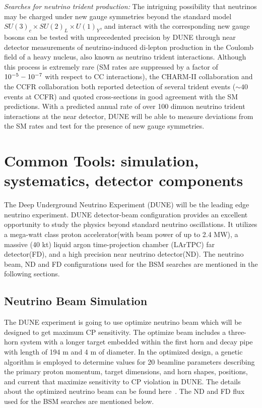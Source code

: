 {\it Searches for neutrino trident production:} The intriguing possibility that neutrinos may be charged under new gauge symmetries beyond the standard model $SU(3)_{c} \times SU(2)_{L} \times U(1)_{Y}$, and interact with the corresponding new gauge bosons can be tested with unprecedented precision by DUNE through near detector measurements of neutrino-induced di-lepton production in the Coulomb field of a heavy nucleus, also known as neutrino trident interactions. Although this process is extremely rare (SM rates are suppressed by a factor of $10^{-5} \-- 10^{-7}$ with respect to CC interactions), the CHARM-II collaboration and the CCFR collaboration both reported detection of several trident events ($\sim40$ events at CCFR) and quoted cross-sections in good agreement with the SM predictions. With a predicted annual rate of over 100 dimuon neutrino trident interactions at the near detector, DUNE will be able to measure deviations from the SM rates and test for the presence of new gauge symmetries.


\section{Common Tools: simulation, systematics, detector components}
The Deep Underground Neutrino Experiment (DUNE) will be the leading edge neutrino experiment. DUNE detector-beam configuration  provides an excellent opportunity to study the physics beyond standard neutrino
oscillations. It utilizes a mega-watt class proton accelerator(with beam power of up to 2.4 MW), a massive (40 kt) liquid argon time-projection chamber (LArTPC) far detector(FD), and a high precision near neutrino detector(ND). The neutrino beam, ND and FD configurations used for the BSM searches are mentioned in the following sections.
\subsection{Neutrino Beam Simulation}
The DUNE experiment is going to use optimize neutrino beam which will be designed to get maximum CP sensitivity. The optimize beam includes  a three-horn system with a longer target embedded within the first horn and decay pipe with length of 194 m and 4 m of diameter. In the optimized design, a genetic algorithm is employed to determine values for 20 beamline parameters describing the primary proton momentum, target dimensions, and horn shapes, positions, and current that maximize sensitivity to CP violation in DUNE. The details about the optimized neutrino beam can be found here~\cite{Laura:2017}. The ND and FD flux used for the BSM searches are mentioned below. 

